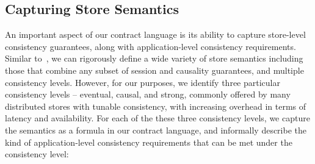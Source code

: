 \subsection{Capturing Store Semantics}
\label{sec:store_sem}

An important aspect of our contract language is its ability to capture
store-level consistency guarantees, along with application-level
consistency requirements. Similar to~\cite{Burckhardt2014}, we can
rigorously define a wide variety of store semantics including those
that combine any subset of session and causality guarantees, and
multiple consistency levels.  However, for our purposes, we identify
three particular consistency levels -- eventual, causal, and strong,
commonly offered by many distributed stores with tunable consistency,
with increasing overhead in terms of latency and availability. For
each of the these three consistency levels, we capture the semantics
as a formula in our contract language, and informally describe the kind
of application-level consistency requirements that can be met under the
consistency level:


